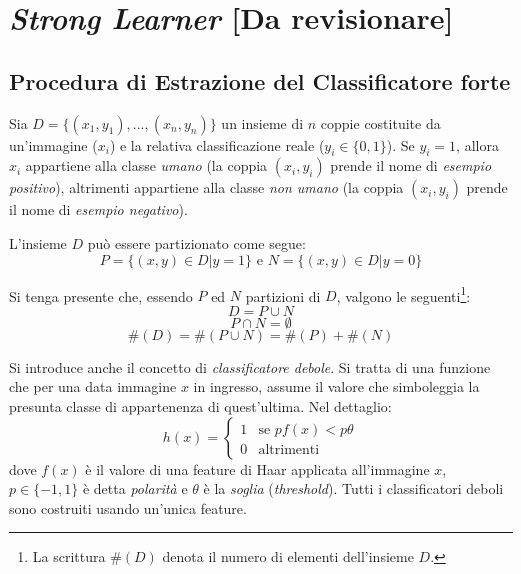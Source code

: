     \section{\emph{Strong Learner} [Da revisionare]}
    \label{sec:strong_learner}
        \subsection{Procedura di Estrazione del Classificatore forte}
            Sia $D = \{(x_1, y_1), ..., (x_n, y_n)\}$ un insieme di $n$ coppie costituite da un'immagine ($x_i$) e la relativa classificazione reale ($y_i \in \{ 0, 1 \}$). Se $y_i = 1$, allora $x_i$ appartiene alla classe \emph{umano} (la coppia $(x_i, y_i)$ prende il nome di \emph{esempio positivo}), altrimenti appartiene alla classe \emph{non umano} (la coppia $(x_i, y_i)$ prende il nome di \emph{esempio negativo}).

            L'insieme $D$ può essere partizionato come segue:
            $$P = \{(x, y) \in D | y = 1\} \text{ e } N = \{(x,y) \in D | y = 0\}$$

            Si tenga presente che, essendo $P$ ed $N$ partizioni di $D$, valgono le seguenti\footnote{La scrittura $\#(D)$ denota il numero di elementi dell'insieme $D$.}:
            \begin{equation}
                D = P \cup N
            \end{equation}
            \begin{equation}
                P \cap N = \emptyset
            \end{equation}
            \begin{equation}
                \#(D) = \#(P \cup N) = \#(P) + \#(N)
            \end{equation}

            Si introduce anche il concetto di \emph{classificatore debole}. Si tratta di una funzione che per una data immagine $x$ in ingresso, assume il valore che simboleggia la presunta classe di appartenenza di quest'ultima.
            Nel dettaglio:
            \begin{equation}
                h(x) = \begin{cases}
                1 & \text{se $pf(x) < p\theta$}\\
                0 & \text{altrimenti}
            \end{cases}
            \end{equation}
            dove $f(x)$ è il valore di una feature di Haar applicata all'immagine $x$, $p \in \{-1,1\}$ è detta \emph{polarità} e $\theta$ è la \emph{soglia} (\emph{threshold}). Tutti i classificatori deboli sono costruiti usando un'unica feature.

